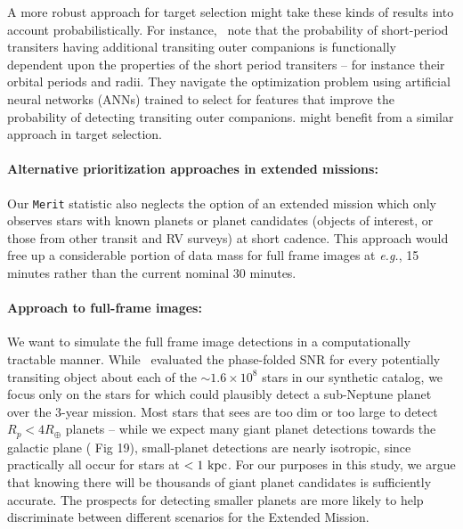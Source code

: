 A more robust approach for \tesss target selection might take these
kinds of results into account probabilistically.  For
instance,~\protect\citet{kipping_transit_2016} note that the
probability of short-period transiters having additional transiting
outer companions is functionally dependent upon the properties of the
short period transiters -- for instance their orbital periods and
radii.  They navigate the optimization problem using artificial neural
networks (ANNs) trained to select for features that improve the
probability of detecting transiting outer companions.  \tess might
benefit from a similar approach in target selection.

\paragraph{Alternative prioritization approaches in extended missions:}
Our \texttt{Merit} statistic also neglects the option of an extended
mission which only observes stars with known planets or planet
candidates (\tesss objects of interest, or those from other transit
and RV surveys) at short cadence.  This approach would free up a
considerable portion of \tesss data mass for full frame images at
\textit{e.g.}, 15 minutes rather than the current nominal 30 minutes.

\paragraph{Approach to full-frame images:}
\label{sec:FFI_simulation}
We want to simulate the full frame image detections in a
computationally tractable manner.  While~
evaluated the phase-folded SNR for every potentially transiting object
about each of the $\sim 1.6\times10^8$ stars in our synthetic catalog,
we focus only on the stars for which \tess could plausibly detect a
sub-Neptune planet over the 3-year mission.  Most stars that
\tess sees are too dim or too large to detect $R_p<4R_\oplus$ planets
-- while we expect many giant planet detections towards the galactic
plane ( Fig 19), small-planet detections are
nearly isotropic, since practically all occur for stars at
$<1\rm\ kpc$.  For our purposes in this study, we argue that knowing
there will be thousands of giant planet candidates is sufficiently
accurate. The prospects for detecting smaller planets are more likely
to help discriminate between different scenarios for the Extended Mission.

